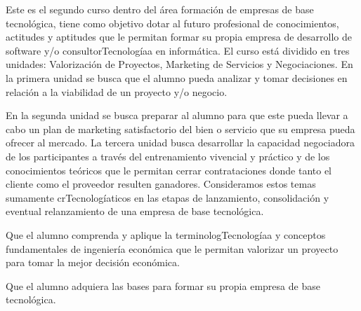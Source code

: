 \begin{syllabus}


\begin{justification}
Este es el segundo curso dentro del área formación de empresas de base tecnológica, tiene como objetivo dotar al futuro profesional de conocimientos, actitudes y aptitudes que le permitan formar su propia empresa de desarrollo de software y/o consultorTecnologíaa en informática. El curso está dividido en tres unidades: Valorización de Proyectos, Marketing de Servicios y Negociaciones. En la primera unidad se busca que el alumno pueda analizar y tomar decisiones en relación a la viabilidad de un proyecto y/o negocio.

En la segunda unidad se busca preparar al alumno para que este pueda llevar a cabo un plan de marketing satisfactorio del bien o servicio que su empresa pueda ofrecer al mercado. La tercera unidad busca desarrollar la capacidad negociadora de los participantes a través del entrenamiento vivencial y práctico y de los conocimientos teóricos que le permitan cerrar contrataciones donde tanto el cliente como el proveedor resulten ganadores. Consideramos estos temas sumamente crTecnologíaticos en las etapas de lanzamiento, consolidación y eventual relanzamiento de una empresa de base tecnológica.
\end{justification}

\begin{goals}
\item Que el alumno comprenda y aplique la terminologTecnologíaa y conceptos fundamentales de ingeniería económica que le permitan valorizar un proyecto para tomar la mejor decisión económica.
\item Que el alumno adquiera las bases para formar su propia empresa de base tecnológica.
\end{goals}

\begin{outcomes}
\end{outcomes}


\end{syllabus}

